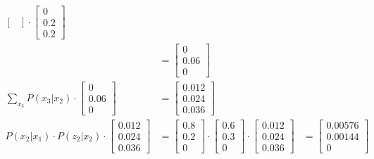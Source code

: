 \documentclass[answers]{exam}
\begin{document}
\begin{questions}
\begin{parts}
\begin{solution}
\begin{align*}
\begin{bmatrix}
                                                                                                                    \end{bmatrix} \cdot \begin{bmatrix} 0 \\ 0.2 \\ 0.2 \end{bmatrix}                                                                                                                                                       \\ &= \begin{bmatrix} 0 \\ 0.06 \\ 0 \end{bmatrix} \\
                \sum_{x_3} P(x_3 | x_2) \cdot \begin{bmatrix} 0 \\ 0.06 \\ 0 \end{bmatrix}                      & = \begin{bmatrix} 0.012 \\ 0.024 \\ 0.036 \end{bmatrix}                                                                                                                                                                   \\
                P(x_{2} | x_1) \cdot P(z_{2} | x_2) \cdot \begin{bmatrix} 0.012 \\ 0.024 \\ 0.036 \end{bmatrix} & = \begin{bmatrix} 0.8 \\ 0.2 \\ 0 \end{bmatrix} \cdot \begin{bmatrix} 0.6 \\ 0.3 \\ 0 \end{bmatrix} \cdot \begin{bmatrix} 0.012 \\ 0.024 \\ 0.036 \end{bmatrix} & = \begin{bmatrix} 0.00576 \\ 0.00144 \\ 0 \end{bmatrix} \\
            \end{align*}


\end{solution}
\end{parts}
\end{questions}
\end{document}

